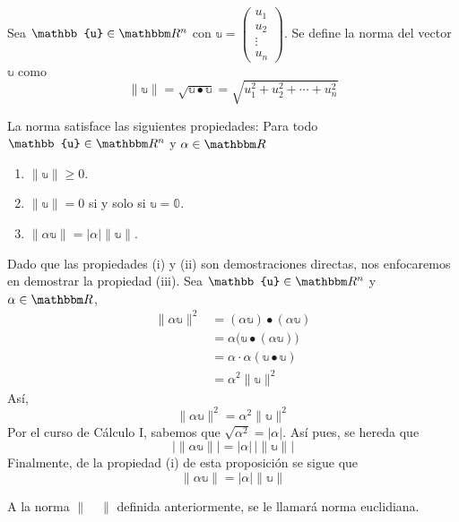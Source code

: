 \begin{definition}
    Sea $\mathbb{u} \in \RR[n]$ con $\mathbb{u} = \begin{pmatrix} u_1 \\ u_2 \\ \vdots \\ u_n \end{pmatrix}$. Se define la norma del vector $\mathbb{u}$ como
    $$\| \mathbb{u} \| = \sqrt{\mathbb{u} \bullet \mathbb{u}} = \sqrt{u_1^2 + u_2^2 + \cdots + u_n^2}$$
\end{definition}

\newpage

\begin{proposition}\label{prop:norma}
    La norma satisface las siguientes propiedades: Para todo $\mathbb{u} \in \RR[n]$ y $\alpha \in \RR$
    \begin{enumerate}[label=\roman*)]
        \item $\| \mathbb{u} \| \geq 0$.
        \item $\| \mathbb{u} \| = 0$ si y solo si $\mathbb{u} = \mathbb{0}$.
        \item $\| \alpha \mathbb{u} \| = |\alpha| \| \mathbb{u} \|$.
    \end{enumerate}
    \demostracion Dado que las propiedades  (i) y (ii) son demostraciones directas, nos enfocaremos en demostrar la propiedad (iii). Sea $\mathbb{u} \in \RR[n]$ y $\alpha \in \RR$,
    \begin{align*}
        \| \alpha \mathbb{u} \|^2 & = (\alpha \mathbb{u}) \bullet (\alpha \mathbb{u}) \\
        & = \alpha \big( \mathbb{u} \bullet (\alpha \mathbb{u}) \big) \\
        & = \alpha \cdot \alpha (\mathbb{u} \bullet \mathbb{u}) \\
        & = \alpha^2 \| \mathbb{u} \|^2
    \end{align*}
    Así,
    $$\| \alpha \mathbb{u} \|^2 = \alpha^2 \| \mathbb{u} \|^2$$
    Por el curso de Cálculo I, sabemos que $\sqrt{\alpha^2} = |\alpha|$. Así pues, se hereda que
    $$\big| \| \alpha \mathbb{u} \| \big| = |\alpha| \, \big| \| \mathbb{u} \| \big|$$
    Finalmente, de la propiedad (i) de esta proposición se sigue que
    $$\| \alpha \mathbb{u} \| = |\alpha| \| \mathbb{u} \|$$
\end{proposition}

\begin{observation}
    A la norma $\| \quad \|$ definida anteriormente, se le llamará norma euclidiana.
\end{observation}

